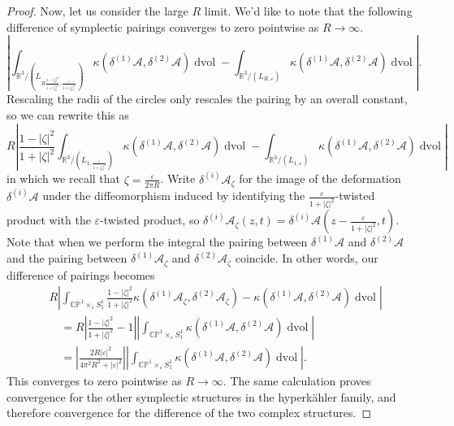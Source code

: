 \documentclass[11pt, oneside, reqno]{amsart}
\theoremstyle{definition} \newtheorem{definition}{Definition}[section]
\theoremstyle{definition} \newtheorem{remark}[definition]{Remark}
\theoremstyle{definition} \newtheorem{remarks}[definition]{Remarks}
\theoremstyle{definition} \newtheorem{question}[definition]{Question}
\theoremstyle{definition} \newtheorem*{note}{Note}
\theoremstyle{definition} \newtheorem{example}[definition]{Example}
\theoremstyle{definition} \newtheorem{examples}[definition]{Examples}
\newcommand{\bb}[1]{\mathbb{#1}}
\newcommand{\mc}[1]{\mathcal{#1}}
\newcommand{\RR}{\mathbb{R}}
\newcommand{\eps}{\varepsilon}
\DeclareMathOperator{\dvol}{dvol}
\begin{document}
\begin{proof}
Now, let us consider the large $R$ limit.  We'd like to note that the following difference of symplectic pairings converges to zero pointwise as $R\to \infty$.
\[ \left\lvert \int_{\RR^3/(L_{R \frac {1-|\zeta|^2}{1+|\zeta|^2},\frac{\eps}{1+|\zeta|^2}})} \kappa(\delta^{(1)} \mc A, \delta^{(2)} \mc A) \dvol - \int_{\RR^3/(L_{R,\eps})} \kappa(\delta^{(1)} \mc A, \delta^{(2)} \mc A) \dvol \right \rvert.\]
Rescaling the radii of the circles only rescales the pairing by an overall constant, so we can rewrite this as 
\[ R\left\lvert \frac {1-|\zeta|^2}{1+|\zeta|^2} \int_{\RR^3/(L_{1,\frac{\eps}{1+|\zeta|^2}})} \kappa(\delta^{(1)} \mc A, \delta^{(2)} \mc A) \dvol - \int_{\RR^3/(L_{1,\eps})} \kappa(\delta^{(1)} \mc A, \delta^{(2)} \mc A) \dvol \right \rvert\]
in which we recall that $\zeta = \frac \eps {2\pi R}$.  Write $\delta^{(i)}\mc A_\zeta$ for the image of the deformation $\delta^{(i)}\mc A$ under the diffeomorphism induced by identifying the $\frac{\eps}{1+|\zeta|^2}$-twisted product with the $\eps$-twisted product, so $\delta^{(i)}\mc A_\zeta(z,t) = \delta^{(i)}\mc A(z-\frac{\eps}{1+|\zeta|^2},t)$.  Note that when we perform the integral the pairing between $\delta^{(1)}\mc A$ and $\delta^{(2)}\mc A$ and the pairing between $\delta^{(1)}\mc A_\zeta$ and $\delta^{(2)}\mc A_\zeta$ coincide.  In other words, our difference of pairings becomes
\begin{align*} 
&R\left\lvert \int_{\bb{CP}^1 \times_\eps S^1_1} \frac {1-|\zeta|^2}{1+|\zeta|^2} \kappa(\delta^{(1)} \mc A_\zeta, \delta^{(2)} \mc A_\zeta)  -  \kappa(\delta^{(1)} \mc A, \delta^{(2)} \mc A) \dvol \right \rvert \\
&\quad = R \left\lvert \frac {1-|\zeta|^2}{1+|\zeta|^2} - 1 \right\rvert \left\lvert \int_{\bb{CP}^1 \times_\eps S^1_1} \kappa(\delta^{(1)} \mc A, \delta^{(2)} \mc A) \dvol \right \rvert \\
&\quad = \left\lvert\frac {2R |\eps|^2}{4 \pi^2 R^2 + |\eps|^2} \right \rvert \left\lvert \int_{\bb{CP}^1 \times_\eps S^1_1} \kappa(\delta^{(1)} \mc A, \delta^{(2)} \mc A) \dvol \right \rvert.
\end{align*}
This converges to zero pointwise as $R \to \infty$.  The same calculation proves convergence for the other symplectic structures in the hyperk\"ahler family, and therefore convergence for the difference of the two complex structures.
\end{proof}
\end{document}
